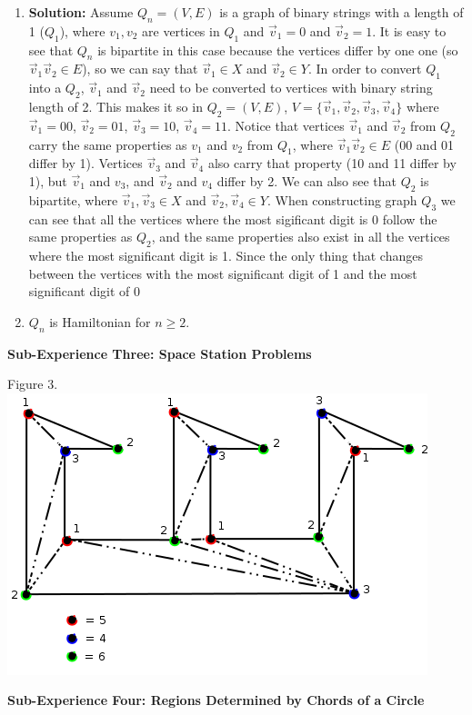 \documentclass[10pt,a4paper]{report}
\begin{document}
\begin{enumerate}
			\item[]\textbf{Solution: }Assume $Q_{n}=(V, E)$ is a graph of binary strings with a length of 1 ($Q_{1}$), where $v_{1}, v_{2}$ are vertices in $Q_{1}$ and $\vec{v}_{1} = 0$ and $\vec{v}_{2} = 1$.  It is easy to see that $Q_{n}$ is bipartite in this case because the vertices differ by one one (so $\vec{v}_{1}\vec{v}_{2}\in E$), so we can say that  $\vec{v}_{1}\in X$ and $\vec{v}_{2}\in Y$.  In order to convert $Q_{1}$ into a $Q_{2}$, $\vec{v}_{1}$ and $\vec{v}_{2}$ need to be converted to vertices with binary string length of 2.  This makes it so in $Q_{2}=(V, E)$, $V = \{\vec{v}_{1}, \vec{v}_{2}, \vec{v}_{3}, \vec{v}_{4}\}$ where $\vec{v}_{1}=00$, $\vec{v}_{2}=01$, $\vec{v}_{3}=10$, $\vec{v}_{4}=11$.  Notice that vertices $\vec{v}_{1}$ and $\vec{v}_{2}$ from $Q_{2}$ carry the same properties as $v_{1}$ and $v_{2}$ from $Q_{1}$, where $\vec{v}_{1}\vec{v}_{2}\in E$ (00 and 01 differ by 1).  Vertices $\vec{v}_{3}$ and $\vec{v}_{4}$ also carry that property (10 and 11 differ by 1), but $\vec{v}_{1}$ and $v_{3}$, and $\vec{v}_{2}$ and $v_{4}$ differ by 2.  We can also see that $Q_{2}$ is bipartite, where $\vec{v}_{1}, \vec{v}_{3}\in X$ and $\vec{v}_{2}, \vec{v}_{4}\in Y$.  When constructing graph $Q_{3}$ we can see that all the vertices where the most sigificant digit is 0 follow the same properties as $Q_{2}$, and the same properties also exist in all the vertices where the most significant digit is 1.  Since the only thing that changes between the vertices with the most significant digit of 1 and the most significant digit of 0
			
			\item $Q_n$ is Hamiltonian for $n \geq 2$.
		\end{enumerate}
		
		
	\textbf{Sub-Experience Three: Space Station Problems}\\
	
		\begin{center}
			Figure 3.\\
			\includegraphics[scale=.5]{e3.png}
			\newline
			\newline
		\end{center}
	\textbf{Sub-Experience Four: Regions Determined by Chords of a Circle}\\
	
\end{document}
